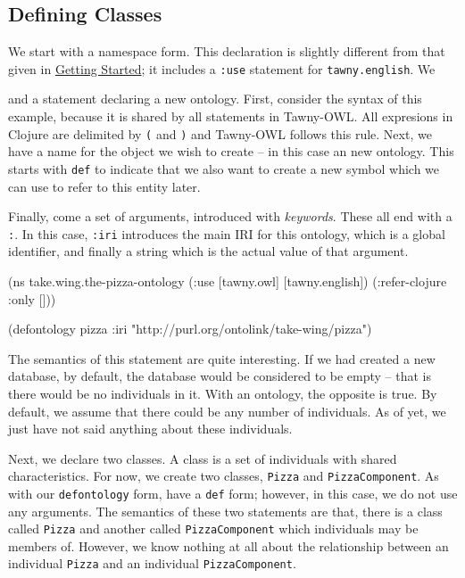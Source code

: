 \subsection{Defining Classes}
\label{sec-5-2}

We start with a namespace form. This declaration is slightly different from
that given in \hyperref[sec-4]{Getting Started}; it includes a \verb~:use~ statement for
\verb~tawny.english~. We 



and a statement declaring a new ontology. First, consider the syntax of
this example, because it is shared by all statements in Tawny-OWL. All
expresions in Clojure are delimited by \verb~(~ and \verb~)~ and Tawny-OWL follows
this rule. Next, we have a name for the object we wish to create -- in
this case an new ontology. This starts with \verb~def~ to indicate that we
also want to create a new symbol which we can use to refer to this
entity later.

Finally, come a set of arguments, introduced with \emph{keywords}. These all
end with a \verb~:~. In this case, \verb~:iri~ introduces the main IRI for this
ontology, which is a global identifier, and finally a string which is
the actual value of that argument.

\begin{tawny}
(ns take.wing.the-pizza-ontology
  (:use [tawny.owl]
	[tawny.english])
  (:refer-clojure :only []))

(defontology pizza :iri "http://purl.org/ontolink/take-wing/pizza")
\end{tawny}


The semantics of this statement are quite interesting. If we had created
a new database, by default, the database would be considered to be empty
-- that is there would be no individuals in it. With an ontology, the
opposite is true. By default, we assume that there could be any number
of individuals. As of yet, we just have not said anything about these
individuals.

Next, we declare two classes. A class is a set of individuals with
shared characteristics. For now, we create two classes, \verb~Pizza~ and
\verb~PizzaComponent~. As with our \verb~defontology~ form, have a \verb~def~ form;
however, in this case, we do not use any arguments. The semantics of
these two statements are that, there is a class called \verb~Pizza~ and
another called \verb~PizzaComponent~ which individuals may be members of.
However, we know nothing at all about the relationship between an
individual \verb~Pizza~ and an individual \verb~PizzaComponent~.


